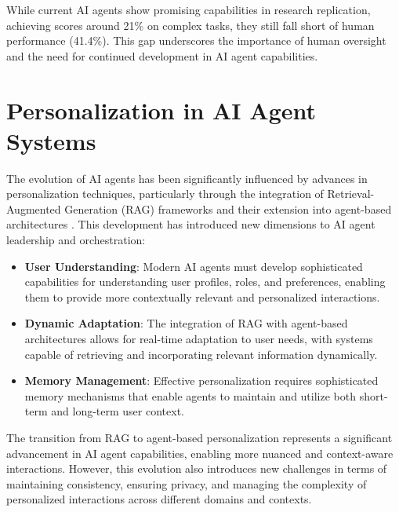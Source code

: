 \documentclass[conference]{IEEEtran}
\begin{document}
While current AI agents show promising capabilities in research replication, achieving scores around 21\% on complex tasks, they still fall short of human performance (41.4\%). This gap underscores the importance of human oversight and the need for continued development in AI agent capabilities.

\section{Personalization in AI Agent Systems}
The evolution of AI agents has been significantly influenced by advances in personalization techniques, particularly through the integration of Retrieval-Augmented Generation (RAG) frameworks and their extension into agent-based architectures \cite{li2024survey}. This development has introduced new dimensions to AI agent leadership and orchestration:

\begin{itemize}
\item \textbf{User Understanding}: Modern AI agents must develop sophisticated capabilities for understanding user profiles, roles, and preferences, enabling them to provide more contextually relevant and personalized interactions.
\item \textbf{Dynamic Adaptation}: The integration of RAG with agent-based architectures allows for real-time adaptation to user needs, with systems capable of retrieving and incorporating relevant information dynamically.
\item \textbf{Memory Management}: Effective personalization requires sophisticated memory mechanisms that enable agents to maintain and utilize both short-term and long-term user context.
\end{itemize}

The transition from RAG to agent-based personalization represents a significant advancement in AI agent capabilities, enabling more nuanced and context-aware interactions. However, this evolution also introduces new challenges in terms of maintaining consistency, ensuring privacy, and managing the complexity of personalized interactions across different domains and contexts.
\end{document}
